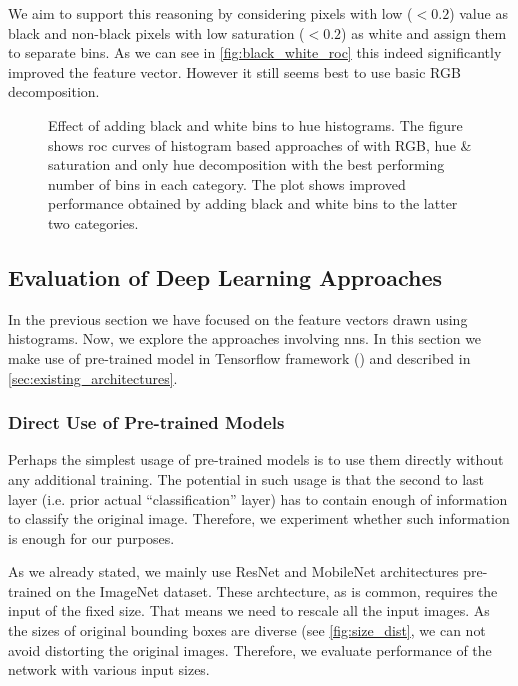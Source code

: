 We aim to support this reasoning by considering pixels with low ($< 0.2$)
value as black and non-black pixels with low saturation ($< 0.2$) as white and
assign them to separate bins. As we can see in \autoref{fig:black_white_roc} this indeed
significantly improved the feature vector. However it still seems best to use basic RGB decomposition.

\begin{figure}
    \centering
    \def\svgwidth{\columnwidth}
    
    \caption[Effect of adding black and white bins to hue histograms]{Effect of adding black and white bins to hue histograms. The figure shows \gls{roc} curves of histogram based approaches of with RGB, hue \& saturation and only hue decomposition with the best performing number of bins in each category. The plot shows improved performance obtained by adding black and white bins to the latter two categories.}
    \label{fig:black_white_roc}
\end{figure}

\subsection{Evaluation of Deep Learning Approaches}

In the previous section we have focused on the feature vectors drawn using
histograms. Now, we explore the approaches involving \glspl{nn}. In this
section we make use of pre-trained model in Tensorflow framework
(\cite{tensorflow}) and described in \autoref{sec:existing_architectures}.

\subsubsection{Direct Use of Pre-trained Models}

Perhaps the simplest usage of pre-trained models is to use them directly
without any additional training. The potential in such usage is that the
second to last layer (i.e. prior actual ``classification'' layer) has to
contain enough of information to classify the original image. Therefore,
we experiment whether such information is enough for our purposes.

As we already stated, we mainly use ResNet and MobileNet architectures
pre-trained on the ImageNet dataset. These archtecture, as is common,
requires the input of the fixed size. That means we need to rescale all the
input images. As the sizes of original bounding boxes are diverse (see
\autoref{fig:size_dist}, we can not avoid distorting the original images.
Therefore, we evaluate performance of the network with various input sizes.

